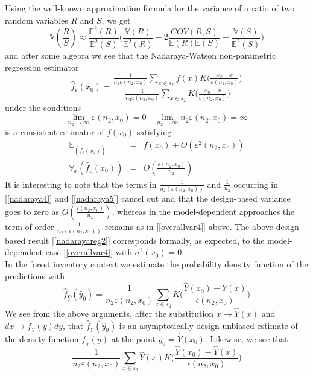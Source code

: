 \documentclass[a4paper,12pt,leqno, titlepage]{article}
\newcommand{\EX}{\mathbb{E}}
\newcommand{\VAR}{\mathbb{V}}
\begin{document}
\begin{appendix}
Using the well-known approximation formula for the variance of a ratio of two random variables $R$ and $S$, we get
\begin{equation}\label{varianceratio}
\VAR(\frac{R}{S})\approx
\frac{\EX^2(R)}{\EX^2(S)}\Big(\frac{\VAR(R)}{\EX^2(R)}-2\frac{COV(R,S)}{\EX(R)\EX(S)}+\frac{\VAR(S)}{\EX^2(S)}\Big)
\end{equation}
and after some algebra we see that the Nadaraya-Watson non-parametric regression estimator
\begin{equation}\label{nadarayareg1}
\hat{f}_{\varepsilon}(x_0)=\frac{\frac{1}{n_2\varepsilon(n_2,x_0)}\sum_{x\in{s_2}}f(x)K\big(\frac{x_0-x}{\varepsilon(n_2,x_0)}\big)}
{\frac{1}{n_2\varepsilon(n_2,x_0)}\sum_{x\in{s_2}}K\big(\frac{x_0-x}{\varepsilon(n_2,x_0)}\big)}
\end{equation}
under the conditions
$$\lim_{n_2\to\infty}\varepsilon(n_2,x_0)=0\quad \lim_{n_2\to\infty}n_2\varepsilon(n_2,x_0)=\infty$$
is a consistent estimator of $f(x_0)$ satisfying
\begin{eqnarray}\label{nadarayareg2}
\EX_(\hat{f}_{\varepsilon}(x_0))&=& f(x_0)+O(\varepsilon^2(n_2,x_0)) \nonumber\\
\VAR_x(\hat{f}_{\varepsilon}(x_0))&=& O(\frac{\varepsilon(n_2,x_0)}{n_2})
\end{eqnarray}
It is interesting to note that the terms in $\frac{1}{n_2(\varepsilon(n_2,x_0))}$ and $\frac{1}{n_2}$ occurring in [\ref{nadaraya4}] and [\ref{nadaraya5}] cancel out and that the design-based variance goes to zero as $O(\frac{\varepsilon(n_2,x_0)}{n_2})$, whereas in the model-dependent approaches the term of order $\frac{1}{n_2(\varepsilon(n_2,x_0))}$ remains as in [\ref{overallvar4}] above. The above design-based result [\ref{nadarayareg2}] corresponds formally, as expected, to the model-dependent case [\ref{overallvar4}] with $\sigma^2(x_0)=0$.\\
In the forest inventory context we estimate the probability density function of the predictions with
$$\hat{f}_{\hat{Y}}(\hat{y}_0)=
\frac{1}{n_2\varepsilon(n_2,x_0)}\sum_{x\in{s_2}}K\big(\frac{\hat{Y}(x_0)-\hat{Y}(x)}{\epsilon(n_2,x_0)}\big)$$
We see from the above arguments, after the substitution $x\rightarrow \hat{Y}(x)$ and $dx\rightarrow f_{\hat{Y}}(y)dy$,  that $\hat{f}_{\hat{Y}}(\hat{y}_0)$ is an asymptotically design unbiased estimate of the density function $f_{\hat{Y}}(y)$ at the point $y_0=\hat{Y}(x_0)$. Likewise, we see that
$$\frac{1}{n_2\varepsilon(n_2,x_0)}\sum_{x\in{s_2}}\hat{Y}(x)K\big(\frac{\hat{Y}(x_0)-\hat{Y}(x)}{\epsilon(n_2,x_0)}\big)$$

\end{appendix}
\end{document}
